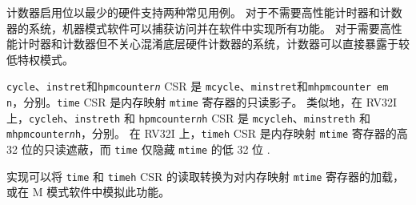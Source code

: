 \iffalse
\begin{commentary}
The counter-enable bits support two common use cases with minimal hardware.
For systems that do not need high-performance timers and counters,
machine-mode software can trap accesses and implement all features in
software.  For systems that need high-performance timers and counters
but are not concerned with obfuscating the underlying hardware
counters, the counters can be directly exposed to lower privilege modes.
\end{commentary}
\fi

\begin{commentary}
计数器启用位以最少的硬件支持两种常见用例。 对于不需要高性能计时器和计数器的系统，机器模式软件可以捕获访问并在软件中实现所有功能。 对于需要高性能计时器和计数器但不关心混淆底层硬件计数器的系统，计数器可以直接暴露于较低特权模式。
\end{commentary}

\iffalse
The {\tt cycle}, {\tt instret}, and {\tt hpmcounter{\em n}} CSRs are
read-only shadows of {\tt mcycle}, {\tt minstret}, and {\tt mhpmcounter{\em
n}}, respectively.  The {\tt time} CSR is a read-only shadow of the
memory-mapped {\tt mtime} register.  Analogously, on RV32I the {\tt cycleh},
{\tt instreth} and {\tt hpmcounter{\em n}h} CSRs are read-only shadows of
{\tt mcycleh}, {\tt minstreth} and {\tt mhpmcounter{\em n}h}, respectively.
On RV32I the {\tt timeh} CSR is a read-only shadow of the upper 32 bits of
the memory-mapped {\tt mtime} register, while {\tt time} shadows only the
lower 32 bits of {\tt mtime}.
\fi

{\tt cycle}、{\tt instret}和{\tt hpmcounter{\em n}} CSR 是 {\tt mcycle}、{\tt minstret}和{\tt mhpmcounter{\ em n}}，分别。{\tt time} CSR 是内存映射 {\tt mtime} 寄存器的只读影子。 类似地，在 RV32I 上，{\tt cycleh}、{\tt instreth} 和 {\tt hpmcounter{\em n}h} CSR 是 {\tt mcycleh}、{\tt minstreth} 和 {\tt mhpmcounter{\em n}h}，分别。 在 RV32I 上，{\tt timeh} CSR 是内存映射 {\tt mtime} 寄存器的高 32 位的只读遮蔽，而 {\tt time} 仅隐藏 {\tt mtime} 的低 32 位 .

\iffalse
\begin{commentary}
Implementations can convert reads of the {\tt time} and {\tt timeh} CSRs
into loads to the memory-mapped {\tt mtime} register, or emulate this
functionality in M-mode software.
\end{commentary}
\fi

\begin{commentary}
实现可以将 {\tt time} 和 {\tt timeh} CSR 的读取转换为对内存映射 {\tt mtime} 寄存器的加载，或在 M 模式软件中模拟此功能。
\end{commentary}

